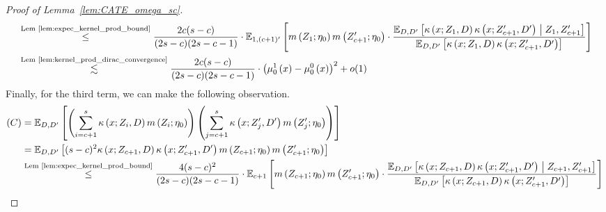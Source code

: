 \begin{proof}[Proof of Lemma~\ref{lem:CATE_omega_sc}]
\begin{equation}
\begin{aligned}
            & \overset{\text{Lem \ref{lem:expec_kernel_prod_bound}}}{\leq} \frac{2c(s-c)}{(2s-c)(2s-c-1)} \cdot \mathbb{E}_{1, (c+1)^{\prime}}\left[m\left(Z_{1}; \eta_{0}\right) m\left(Z_{c+1}^{\prime}; \eta_{0}\right)\cdot \frac{\mathbb{E}_{D, D^{\prime}}\left[\kappa\left(x; Z_{1}, D\right)\kappa\left(x; Z_{c+1}^{\prime}, D^{\prime}\right) \; \middle| \; Z_{1}, Z_{c+1}^{\prime}\right]}{\mathbb{E}_{D, D^{\prime}}\left[\kappa\left(x; Z_{1}, D\right)\kappa\left(x; Z_{c+1}^{\prime}, D^{\prime}\right)\right]}\right]\\
			& \overset{\text{Lem \ref{lem:kernel_prod_dirac_convergence}}}{\lesssim} 
            \frac{2c(s-c)}{(2s-c)(2s-c-1)} \cdot \left(\mu_{0}^{1}\left(x\right) - \mu_{0}^{0}\left(x\right)\right)^2 + o(1)
		\end{aligned}
	\end{equation}
    Finally, for the third term, we can make the following observation.
	\begin{equation}
		\begin{aligned}
			(C)
			& = \E_{D, D^{\prime}}\left[\left(\sum_{i = c + 1}^{s} \kappa\left(x; Z_{i}, D\right) m\left(Z_{i}; \eta_{0}\right)\right)
            \left(\sum_{j = c + 1}^{s} \kappa\left(x; Z_{j}^{\prime}, D^{\prime}\right) m\left(Z_{j}^{\prime}; \eta_{0}\right)\right)\right] \\
			& = \E_{D, D^{\prime}}\left[(s-c)^2 \kappa\left(x; Z_{c+1}, D\right)\kappa\left(x; Z_{c+1}^{\prime}, D^{\prime}\right)
			m\left(Z_{c+1}; \eta_{0}\right)  m\left(Z_{c+1}^{\prime}; \eta_{0}\right)\right] \\
			& \overset{\text{Lem \ref{lem:expec_kernel_prod_bound}}}{\leq}
            \frac{4(s-c)^2}{(2s-c)(2s-c-1)} \cdot \E_{c+1}\left[m\left(Z_{c+1}; \eta_{0}\right)  m\left(Z_{c+1}^{\prime}; \eta_{0}\right)
            \cdot \frac{\E_{D, D^{\prime}}\left[\kappa\left(x; Z_{c+1}, D\right)\kappa\left(x; Z_{c+1}^{\prime}, D^{\prime}\right) \; \middle| \; Z_{c+1}, Z_{c+1}^{\prime}\right]}{\E_{D, D^{\prime}}\left[\kappa\left(x; Z_{c+1}, D\right)\kappa\left(x; Z_{c+1}^{\prime}, D^{\prime}\right)\right]}\right]\\

\end{aligned}
\end{equation}
\end{proof}
